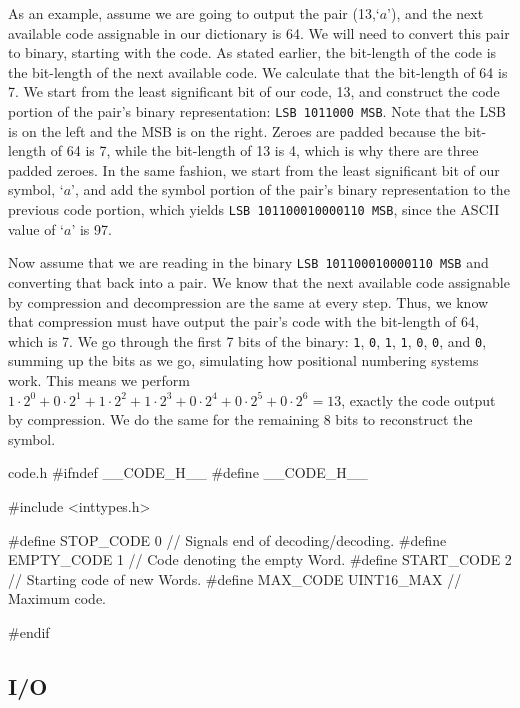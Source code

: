 \documentclass{article}
\begin{document}
As an example, assume we are going to output the pair (13,\;`$a$'), and the next
available code assignable in our dictionary is 64. We will need to convert this
pair to binary, starting with the code. As stated earlier, the bit-length of the
code is the bit-length of the next available code. We calculate that the bit-length
of 64 is 7. We start from the least significant bit of our code, 13, and
construct the code portion of the pair's binary representation:
\texttt{LSB 1011000 MSB}. Note that the LSB is on the left and the MSB
is on the right. Zeroes are padded because the bit-length of 64 is 7,
while the bit-length of 13 is 4, which is why there are three padded
zeroes.  In the same fashion, we start from the least significant bit of
our symbol, `$a$', and add the symbol portion of the pair's binary
representation to the previous code portion, which yields \texttt{LSB
101100010000110 MSB}, since the ASCII value of `$a$' is 97.

Now assume that we are reading in the binary \texttt{LSB 101100010000110
MSB} and converting that back into a pair. We know that the next
available code assignable by compression and decompression are the same
at every step. Thus, we know that compression must have output the
pair's code with the bit-length of 64, which is 7. We go through the
first 7 bits of the binary: \texttt{1}, \texttt{0}, \texttt{1},
\texttt{1}, \texttt{0}, \texttt{0}, and \texttt{0}, summing up the bits
as we go, simulating how positional numbering systems work.  This means
we perform $1 \cdot 2^0 + 0 \cdot 2^1 + 1 \cdot 2^2 + 1 \cdot 2^3 + 0
\cdot 2^4 + 0 \cdot 2^5 + 0 \cdot 2^6 = 13$, exactly the code output by
compression. We do the same for the remaining 8 bits to reconstruct the
symbol.

\begin{codelisting}{code.h}
#ifndef __CODE_H__
#define __CODE_H__

#include <inttypes.h>

#define STOP_CODE   0         // Signals end of decoding/decoding.
#define EMPTY_CODE  1             // Code denoting the empty Word.
#define START_CODE  2             // Starting code of new Words.
#define MAX_CODE    UINT16_MAX    // Maximum code.

#endif
\end{codelisting}

\subsection{I/O}
\end{document}
